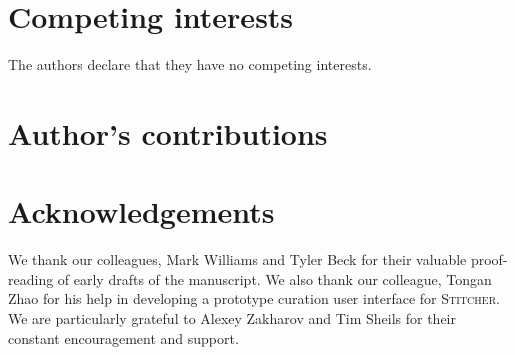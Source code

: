 \documentclass{bmcart}
\newcommand\st{\textsc{Stitcher}}
\begin{document}
\begin{backmatter}

\section*{Competing interests}
  The authors declare that they have no competing interests.

\section*{Author's contributions}


\section*{Acknowledgements}
We thank our colleagues, Mark Williams and Tyler Beck for their
valuable proof-reading of early drafts of the manuscript. We also
thank our colleague, Tongan Zhao for his help in developing a
prototype curation user interface for \st. We are particularly grateful
to Alexey Zakharov and Tim Sheils for their constant encouragement and
support.





\end{backmatter}
\end{document}
